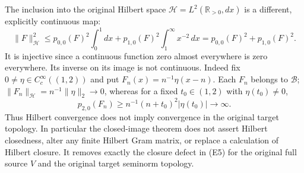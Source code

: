 \documentclass[11pt]{article}
\newcommand{\B}{\mathscr B}
\newcommand{\HH}{\mathcal H}
\newcommand{\R}{\mathbb R}
\begin{document}
The inclusion into the original Hilbert space
$\HH=L^2(\R_{>0},dx)$ is a different, explicitly continuous map:
\begin{equation}\label{eq:Hilbert}
 \|F\|_{\HH}^2
 \leq p_{0,0}(F)^2\int_0^1dx
          +p_{1,0}(F)^2\int_1^\infty x^{-2}\,dx
 =p_{0,0}(F)^2+p_{1,0}(F)^2.
\end{equation}
It is injective since a continuous function zero almost everywhere
is zero everywhere. Its inverse on its image is not continuous.
Indeed fix $0\ne\eta\in C_c^\infty((1,2))$ and put
$F_n(x)=n^{-1}\eta(x-n)$. Each $F_n$ belongs to $\B$;
$\|F_n\|_{\HH}=n^{-1}\|\eta\|_2\to0$, whereas for a fixed
$t_0\in(1,2)$ with $\eta(t_0)\ne0$,
\[
 p_{2,0}(F_n)\geq n^{-1}(n+t_0)^2|\eta(t_0)|\longrightarrow\infty.
\]
Thus Hilbert convergence does not imply convergence in the original
target topology. In particular the closed-image theorem does not
assert Hilbert closedness, alter any finite Hilbert Gram matrix, or
replace a calculation of Hilbert closure. It removes exactly the
closure defect in (E5) for the original full source $V$ and the
original target seminorm topology.
\end{document}
